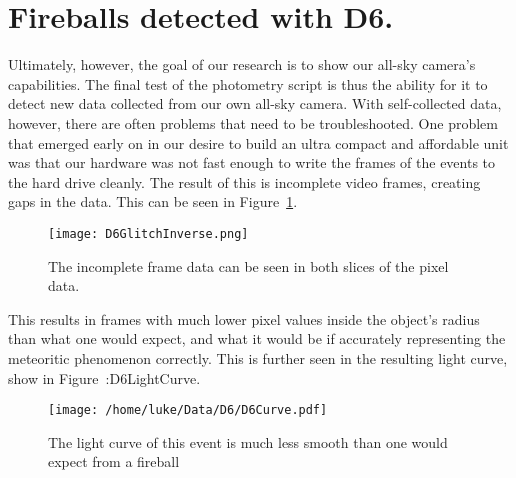 \section{Fireballs detected with D6.}

Ultimately, however, the goal of our research is to show our all-sky camera's capabilities. The final test of the photometry script is thus the ability for it to detect new data collected from our own all-sky camera. With self-collected data, however, there are often problems that need to be troubleshooted. One problem that emerged early on in our desire to build an ultra compact and affordable unit was that our hardware was not fast enough to write the frames of the events to the hard drive cleanly. The result of this is incomplete video frames, creating gaps in the data. This can be seen in Figure~\ref{fig:D6Glitch}. 

\begin{figure}[ht!]
	\centering
	\texttt{[image: D6GlitchInverse.png]}
	\caption{The incomplete frame data can be seen in both slices of the pixel data.}
	\label{fig:D6Glitch}
\end{figure}

This results in frames with much lower pixel values inside the object's radius than what one would expect, and what it would be if accurately representing the meteoritic phenomenon correctly. This is further seen in the resulting light curve, show in Figure~:{D6LightCurve}.

\begin{figure}[ht!]
	\centering
	\texttt{[image: /home/luke/Data/D6/D6Curve.pdf]}
	\caption{The light curve of this event is much less smooth than one would expect from a fireball}
	\label{fig:D6LightCurve}
\end{figure}

